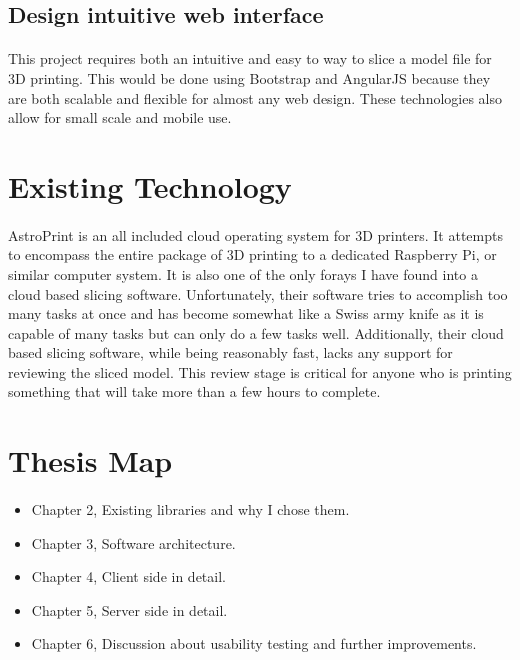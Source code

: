 \subsection{Design intuitive web interface}
\paragraph{}
This project requires both an intuitive and easy to way to slice a model file for 3D printing.
This would be done using Bootstrap and AngularJS because they are both scalable and flexible for almost any web design.
These technologies also allow for small scale and mobile use.

\section{Existing Technology}
\paragraph{}
AstroPrint is an all included cloud operating system for 3D printers.
It attempts to encompass the entire package of 3D printing to a dedicated Raspberry Pi, or similar computer system.
It is also one of the only forays I have found into a cloud based slicing software.
Unfortunately, their software tries to accomplish too many tasks at once and has become somewhat like a Swiss army knife as it is capable of many tasks but can only do a few tasks well.
Additionally, their cloud based slicing software, while being reasonably fast, lacks any support for reviewing the sliced model.
This review stage is critical for anyone who is printing something that will take more than a few hours to complete.

\section{Thesis Map}
\paragraph{}
\begin{itemize}
\item Chapter 2, Existing libraries and why I chose them.
\item Chapter 3, Software architecture. 
\item Chapter 4, Client side in detail. 
\item Chapter 5, Server side in detail.
\item Chapter 6, Discussion about usability testing and further improvements.
\end{itemize}

